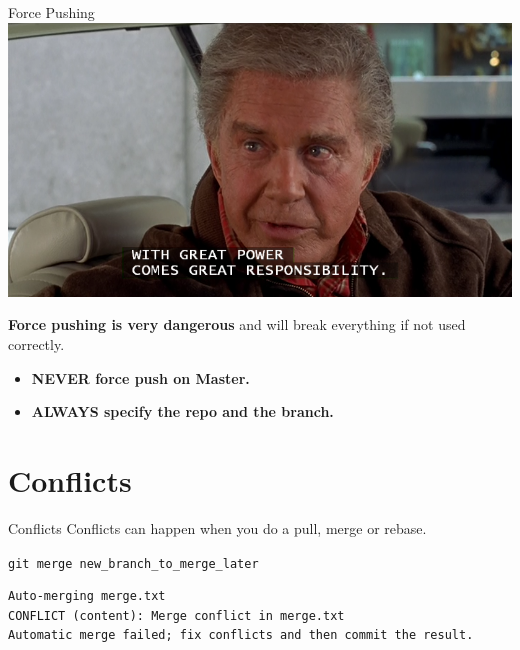 \documentclass[usenames,dvipsnames,9pt]{beamer}
\begin{document}
%
\begin{frame}{Force Pushing}
  \includegraphics[width=\textwidth]{img/spider-man-2002-uncle-ben-cliff-robertson-great-power.png}

  \alert{\textbf{Force pushing is very dangerous}} and will break everything if not used correctly.
  \begin{itemize}
    \item \alert{\textbf{NEVER force push on Master.}}
    \item \alert{\textbf{ALWAYS specify the repo and the branch.}}
  \end{itemize}
\end{frame}



%
%
\section{Conflicts}

%
\begin{frame}[fragile]{Conflicts}
  Conflicts can happen when you do a pull, merge or rebase.

  \lstinline|git merge new_branch_to_merge_later|

  \begin{lstlisting}[basicstyle=\footnotesize\ttfamily]
Auto-merging merge.txt
CONFLICT (content): Merge conflict in merge.txt
Automatic merge failed; fix conflicts and then commit the result.
  \end{lstlisting}
\end{frame}
\end{document}
